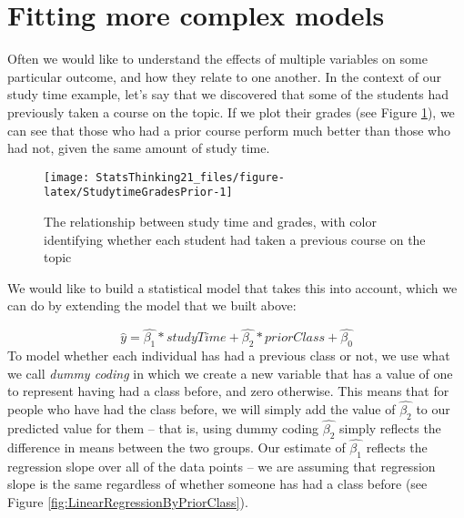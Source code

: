 \documentclass[]{book}
\newenvironment{Shaded}{\begin{snugshade}}{\end{snugshade}}
\newcommand{\KeywordTok}[1]{\textcolor[rgb]{0.13,0.29,0.53}{\textbf{#1}}}
\newcommand{\DataTypeTok}[1]{\textcolor[rgb]{0.13,0.29,0.53}{#1}}
\newcommand{\StringTok}[1]{\textcolor[rgb]{0.31,0.60,0.02}{#1}}
\newcommand{\CommentTok}[1]{\textcolor[rgb]{0.56,0.35,0.01}{\textit{#1}}}
\newcommand{\OperatorTok}[1]{\textcolor[rgb]{0.81,0.36,0.00}{\textbf{#1}}}
\newcommand{\NormalTok}[1]{#1}
\theoremstyle{definition}
\theoremstyle{definition}
\theoremstyle{definition}
\theoremstyle{remark}
\begin{document}
\section{Fitting more complex models}\label{fitting-more-complex-models}

Often we would like to understand the effects of multiple variables on
some particular outcome, and how they relate to one another. In the
context of our study time example, let's say that we discovered that
some of the students had previously taken a course on the topic. If we
plot their grades (see Figure \ref{fig:StudytimeGradesPrior}), we can
see that those who had a prior course perform much better than those who
had not, given the same amount of study time.

\begin{figure}
\texttt{[image: StatsThinking21\_files/figure-latex/StudytimeGradesPrior-1]} \caption{The relationship between study time and grades, with color identifying whether each student had taken a previous course on the topic}\label{fig:StudytimeGradesPrior}
\end{figure}

We would like to build a statistical model that takes this into account,
which we can do by extending the model that we built above:

\[
\hat{y} = \hat{\beta_1}*studyTime + \hat{\beta_2}*priorClass + \hat{\beta_0}
\] To model whether each individual has had a previous class or not, we
use what we call \emph{dummy coding} in which we create a new variable
that has a value of one to represent having had a class before, and zero
otherwise. This means that for people who have had the class before, we
will simply add the value of \(\hat{\beta_2}\) to our predicted value
for them -- that is, using dummy coding \(\hat{\beta_2}\) simply
reflects the difference in means between the two groups. Our estimate of
\(\hat{\beta_1}\) reflects the regression slope over all of the data
points -- we are assuming that regression slope is the same regardless
of whether someone has had a class before (see Figure
\ref{fig:LinearRegressionByPriorClass}).

\begin{Shaded}
\end{Shaded}
\end{document}

